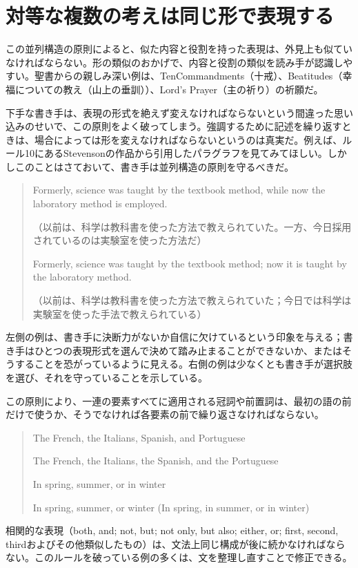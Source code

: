\section{対等な複数の考えは同じ形で表現する}
この並列構造の原則によると、似た内容と役割を持った表現は、外見上も似ていなければならない。形の類似のおかげで、内容と役割の類似を読み手が認識しやすい。聖書からの親しみ深い例は、TenCommandments（十戒）、Beatitudes（幸福についての教え（山上の垂訓））、Lord's Prayer（主の祈り）の祈願だ。
\par
下手な書き手は、表現の形式を絶えず変えなければならないという間違った思い込みのせいで、この原則をよく破ってしまう。強調するために記述を繰り返すときは、場合によっては形を変えなければならないというのは真実だ。例えば、ルール10にあるStevensonの作品から引用したパラグラフを見てみてほしい。しかしこのことはさておいて、書き手は並列構造の原則を守るべきだ。
\begin{quote}
    Formerly, science was taught by the textbook method, while now the
laboratory method is employed.

（以前は、科学は教科書を使った方法で教えられていた。一方、今日採用されているのは実験室を使った方法だ）

Formerly, science was taught by the textbook method; now it is taught by the laboratory method.

（以前は、科学は教科書を使った方法で教えられていた；今日では科学は実験室を使った手法で教えられている）
\end{quote}
左側の例は、書き手に決断力がないか自信に欠けているという印象を与える；書き手はひとつの表現形式を選んで決めて踏み止まることができないか、またはそうすることを恐がっているように見える。右側の例は少なくとも書き手が選択肢を選び、それを守っていることを示している。
\par この原則により、一連の要素すべてに適用される冠詞や前置詞は、最初の語の前だけで使うか、そうでなければ各要素の前で繰り返さなければならない。
\begin{quote}
    The French, the Italians, Spanish, and Portuguese
    
    The French, the Italians, the Spanish, and the Portuguese
    
    In spring, summer, or in winter
    
    In spring, summer, or winter (In spring, in summer, or in winter)
\end{quote}
相関的な表現（both, and; not, but; not only, but also; either, or;
first, second,
thirdおよびその他類似したもの）は、文法上同じ構成が後に続かなければならない。このルールを破っている例の多くは、文を整理し直すことで修正できる。
